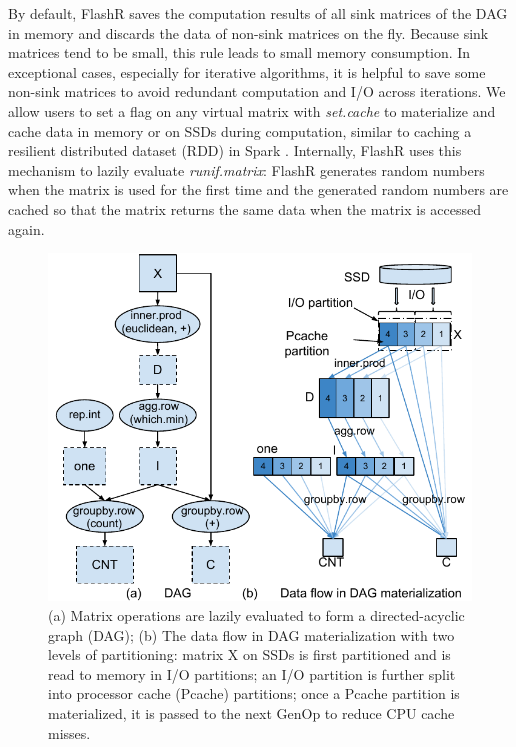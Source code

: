 By default, FlashR saves the computation results of all sink matrices of
the DAG in memory and discards the data of non-sink matrices on the fly.
Because sink matrices tend to be small, this rule leads to small memory
consumption. In exceptional cases, especially for iterative algorithms,
it is helpful to save some non-sink matrices to avoid
redundant computation and I/O across iterations.  We allow users to
set a flag on any virtual matrix with \textit{set.cache} to materialize and
cache data in memory or on SSDs during computation, similar to caching
a resilient distributed dataset (RDD) in Spark \cite{spark}.
Internally, FlashR uses this mechanism to lazily evaluate \textit{runif.matrix}:
FlashR generates random numbers when the matrix is used for the first time and
the generated random numbers are cached so that the matrix returns the same
data when the matrix is accessed again.

\begin{figure}
	\centering
	\includegraphics[scale=0.6]{FlashMatrix_figs/kmeans.pdf}
  \vspace{-4pt}
	\caption{(a) Matrix operations are lazily evaluated to form
	a directed-acyclic graph (DAG); (b) The data flow in DAG materialization
	with two levels of partitioning: matrix X on SSDs is first partitioned
	and is read to memory in I/O partitions; an I/O partition is further
	split into processor cache (Pcache) partitions; once a Pcache partition
	is materialized, it is passed to the next GenOp to reduce CPU cache misses. }
	\label{fig:dag}
  \vspace{-8pt}
\end{figure}

